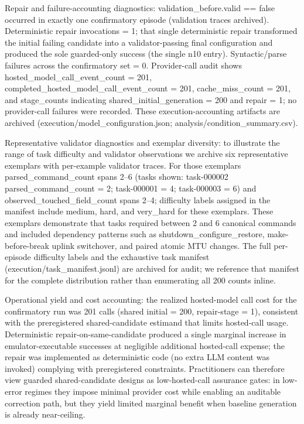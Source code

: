 \documentclass[conference]{IEEEtran}
\begin{document}
Repair and failure-accounting diagnostics: validation\_before.valid == false occurred in exactly one confirmatory episode (validation traces archived). Deterministic repair invocations = 1; that single deterministic repair transformed the initial failing candidate into a validator-passing final configuration and produced the sole guarded-only success (the single n10 entry). Syntactic/parse failures across the confirmatory set = 0. Provider-call audit shows hosted\_model\_call\_event\_count = 201, completed\_hosted\_model\_call\_event\_count = 201, cache\_miss\_count = 201, and stage\_counts indicating shared\_initial\_generation = 200 and repair = 1; no provider-call failures were recorded. These execution-accounting artifacts are archived (execution/model\_configuration.json; analysis/condition\_summary.csv).

Representative validator diagnostics and exemplar diversity: to illustrate the range of task difficulty and validator observations we archive six representative exemplars with per-example validator traces. For those exemplars parsed\_command\_count spans 2--6 (tasks shown: task-000002 parsed\_command\_count = 2; task-000001 = 4; task-000003 = 6) and observed\_touched\_field\_count spans 2--4; difficulty labels assigned in the manifest include medium, hard, and very\_hard for these exemplars. These exemplars demonstrate that tasks required between 2 and 6 canonical commands and included dependency patterns such as shutdown\_configure\_restore, make-before-break uplink switchover, and paired atomic MTU changes. The full per-episode difficulty labels and the exhaustive task manifest (execution/task\_manifest.jsonl) are archived for audit; we reference that manifest for the complete distribution rather than enumerating all 200 counts inline.

Operational yield and cost accounting: the realized hosted-model call cost for the confirmatory run was 201 calls (shared initial = 200, repair-stage = 1), consistent with the preregistered shared-candidate estimand that limits hosted-call usage. Deterministic repair-on-same-candidate produced a single marginal increase in emulator-executable successes at negligible additional hosted-call expense; the repair was implemented as deterministic code (no extra LLM content was invoked) complying with preregistered constraints. Practitioners can therefore view guarded shared-candidate designs as low-hosted-call assurance gates: in low-error regimes they impose minimal provider cost while enabling an auditable correction path, but they yield limited marginal benefit when baseline generation is already near-ceiling.
\end{document}

